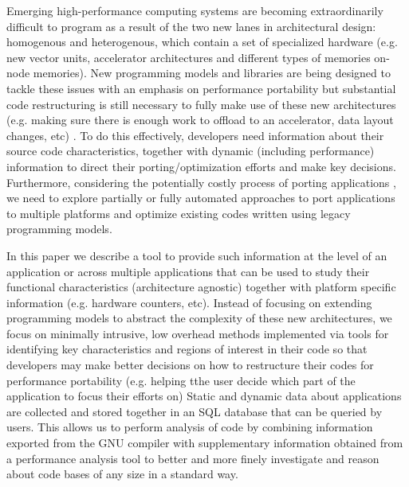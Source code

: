 Emerging high-performance computing systems are becoming extraordinarily difficult to program as a result of the  
two new lanes in architectural design:  homogenous and heterogenous, which contain a set of specialized 
hardware (e.g. new vector units,  accelerator architectures and different types of memories on-node memories). 
New programming models and libraries are being designed to tackle these issues with an emphasis on performance portability but substantial code restructuring is still 
necessary to fully make use of these new architectures (e.g. making sure there is enough work to offload to an accelerator, data layout changes, etc) \cite{anantharaj2013}\cite{titan}.
To do this effectively, developers need information about their source code characteristics, together with 
dynamic (including performance) information to direct their porting/optimization efforts and make key decisions.
Furthermore, considering the potentially costly process of porting applications \cite{larrea2016early}, we need to 
explore partially or fully automated approaches to port applications to multiple platforms and optimize existing 
codes written using legacy programming models.

In this paper we describe a tool to provide such information at the level of an 
application or across multiple applications that can be used to study their functional characteristics (architecture agnostic) together with platform specific information (e.g. hardware counters, etc).
Instead of focusing on extending programming models to abstract the complexity of these new architectures, we 
focus on minimally intrusive, low overhead methods implemented via tools for identifying key characteristics and 
regions of interest in their code so that developers may make better decisions on how to restructure their codes for performance 
portability (e.g. helping tthe user decide which part of the application to focus their efforts on)
Static and dynamic data about applications are collected and stored together in an \acs{SQL} database that can be 
queried by users.
This allows us to perform analysis of code by combining information exported from the GNU compiler with 
supplementary information obtained from a performance analysis tool to better and more finely investigate and 
reason about code bases of any size in a standard way.

